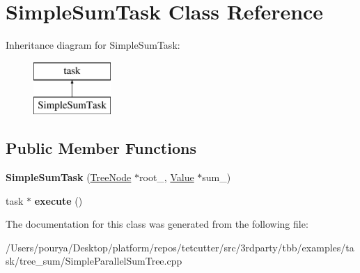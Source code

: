 \hypertarget{classSimpleSumTask}{}\section{Simple\+Sum\+Task Class Reference}
\label{classSimpleSumTask}
Inheritance diagram for Simple\+Sum\+Task\+:\begin{figure}[H]
\begin{center}
\leavevmode
\includegraphics[height=2.000000cm]{classSimpleSumTask}
\end{center}
\end{figure}
\subsection*{Public Member Functions}
\begin{DoxyCompactItemize}
\item 
\hypertarget{classSimpleSumTask_a97979fc85ed6339fc0c4376dda40f75d}{}{\bfseries Simple\+Sum\+Task} (\hyperlink{structTreeNode}{Tree\+Node} $\ast$root\+\_\+, \hyperlink{structValue}{Value} $\ast$sum\+\_\+)\label{classSimpleSumTask_a97979fc85ed6339fc0c4376dda40f75d}

\item 
\hypertarget{classSimpleSumTask_ae6eac9031b39432538723130c7ac0914}{}task $\ast$ {\bfseries execute} ()\label{classSimpleSumTask_ae6eac9031b39432538723130c7ac0914}

\end{DoxyCompactItemize}


The documentation for this class was generated from the following file\+:\begin{DoxyCompactItemize}
\item 
/\+Users/pourya/\+Desktop/platform/repos/tetcutter/src/3rdparty/tbb/examples/task/tree\+\_\+sum/Simple\+Parallel\+Sum\+Tree.\+cpp\end{DoxyCompactItemize}
